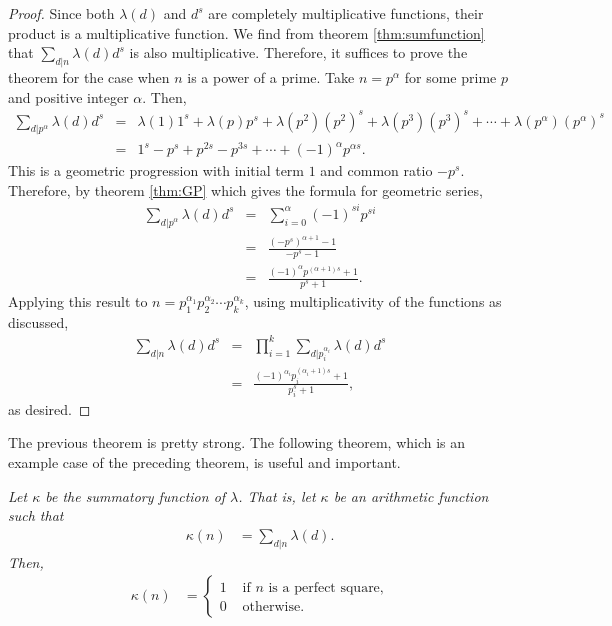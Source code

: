 \documentclass[12pt]{subfile}
\begin{document}
		\begin{proof}
			Since both $\lambda(d)$ and $d^s$ are completely multiplicative functions, their product is a multiplicative function. We find from theorem \ref{thm:sumfunction} that $\sum\limits_{d|n} \lambda(d) d^s$ is also multiplicative. Therefore, it suffices to prove the theorem for the case when $n$ is a power of a prime. Take $n=p^\alpha$ for some prime $p$ and positive integer $\alpha$. Then,
				\begin{eqnarray*}
					\sum_{d|p^\alpha} \lambda(d) d^s &=& \lambda(1) 1^s + \lambda(p) p^s + \lambda(p^2) \left(p^2\right)^s +\lambda(p^3) \left(p^3\right)^s+ \cdots + \lambda(p^\alpha) \left(p^\alpha \right)^s\\
											 &=& 1^s - p^s + p^{2s} - p^{3s} +\cdots + \left(-1\right)^{\alpha} p^{\alpha s}.
				\end{eqnarray*}
			This is a geometric progression with initial term $1$ and common ratio $-p^s$. Therefore, by theorem \ref{thm:GP} which gives the formula for geometric series,
				\begin{eqnarray*}
					\sum_{d|p^\alpha} \lambda(d) d^s &=& \sum_{i=0}^{\alpha} (-1)^{si}p^{si}\\
											 &= &\frac{\left(-p^s\right)^{\alpha + 1} -1}{-p^s -1}\\
											 &=& \frac{(-1)^\alpha p^{(\alpha + 1)s} + 1}{p^s + 1}.
				\end{eqnarray*}
			Applying this result to $n= p_1^{\alpha_1} p_2^{\alpha_2} \cdots p_k^{\alpha_k}$, using multiplicativity of the functions as discussed,
				\begin{eqnarray*}
					\sum_{d|n} \lambda(d) d^s  &=& \prod_{i=1}^{k}\sum_{d|p_i^{\alpha_i}} \lambda(d) d^s \\
										   &=& \frac{(-1)^{\alpha_i} p_i^{(\alpha_i+1)s} + 1}{p_i^s + 1},
				\end{eqnarray*}
			as desired.
		\end{proof}

	The previous theorem is pretty strong. The following theorem, which is an example case of the preceding theorem, is useful and important.

		\begin{theorem}\slshape \label{thm:liouville-sum-function}
			Let $\kappa$ be the summatory function of $\lambda$. That is, let $\kappa$ be an arithmetic function such that
				\begin{align*}
					\kappa (n) & = \sum_{d|n}\lambda(d).
				\end{align*}
			Then,
				\begin{align*}
					\kappa(n) & =
						\begin{cases}
							1&\text{ if }n\text{ is a perfect square,}\\
							0&\text{ otherwise.}
						\end{cases}
				\end{align*}
		\end{theorem}
\end{document}

